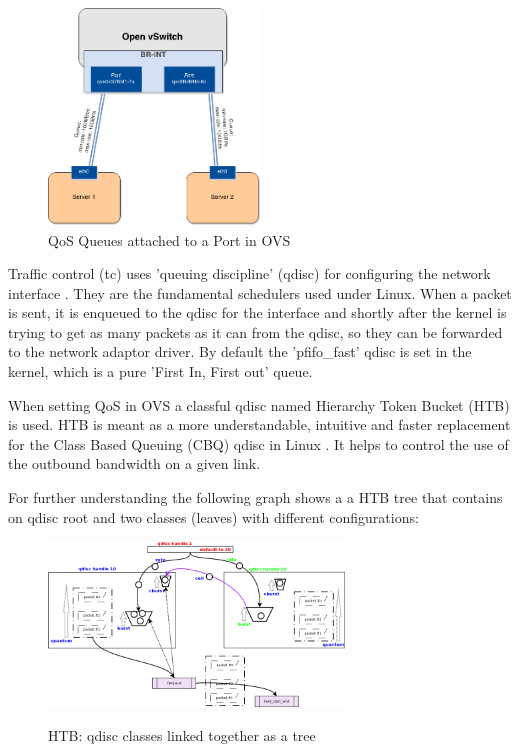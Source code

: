 \begin{figure}[H]
\centering
\includegraphics[width=0.5\textwidth]{images/fundamentals/openvswitch_qos-queues.png}
\caption{QoS Queues attached to a Port in OVS}
\end{figure}


Traffic control (tc) uses 'queuing discipline' (qdisc) for configuring the network interface \cite{tc-manual}. They are the fundamental schedulers used under Linux. When a packet is sent, it is enqueued to the qdisc for the interface and shortly after the kernel is trying to get as many packets as it can from the qdisc, so they can be forwarded to the network adaptor driver. By default the 'pfifo\_fast' qdisc is set in the kernel, which is a pure 'First In, First out' queue.

When setting QoS in OVS a classful qdisc named Hierarchy Token Bucket (HTB) is used. HTB is meant as a more understandable, intuitive and faster replacement for the Class Based Queuing (CBQ) qdisc in Linux \cite{htb-guide}. It helps to control the use of the outbound bandwidth on a given link. 

For further understanding the following graph shows a a HTB tree that contains on qdisc root and two classes (leaves) with different configurations:

\begin{figure}[H]
\centering
\includegraphics[width=0.7\textwidth]{images/fundamentals/htb_qdisc.png}
\caption{HTB: qdisc classes linked together as a tree} \cite{htb-qdiscs} 
\end{figure}

